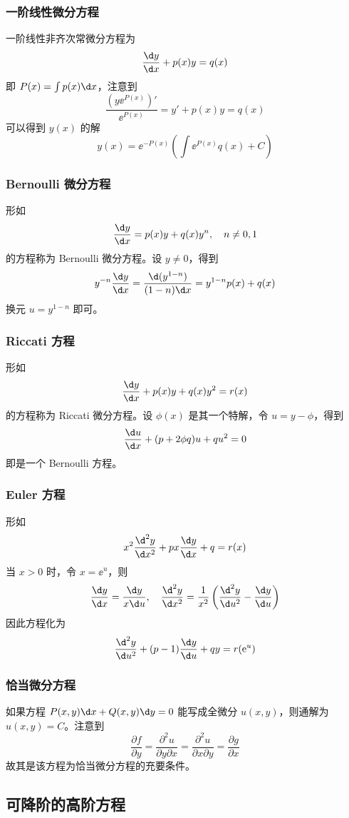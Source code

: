 \subsubsection*{一阶线性微分方程}

一阶线性非齐次常微分方程为
\[ \frac{\d y}{\d x} + p(x) y = q(x) \]
即 $P(x) = \int p(x) \d x$，注意到
\[ \frac{\left(y\ee^{P(x)}\right)'}{\ee^{P(x)}} =  y' + p(x) y = q(x) \]
可以得到 $y(x)$ 的解
\[ y(x) = \ee^{-P(x)} \left( \int \ee^{P(x)} q(x) + C \right)  \]

\subsubsection*{Bernoulli 微分方程} 形如
\[ \frac{\d y}{\d x} = p(x) y + q(x) y^n, \quad n \neq 0,1 \]
的方程称为 Bernoulli 微分方程。设 $y \neq 0$，得到
\[ y^{-n} \frac{\d y}{\d x} = \frac{\d (y^{1-n})}{(1-n)\d x} = y^{1-n}p(x) + q(x) \]
换元 $u = y^{1-n}$ 即可。

\subsubsection*{Riccati 方程}
形如
\[ \frac{\d y}{\d x} + p(x) y + q(x)y^2 = r(x) \]
的方程称为 Riccati 微分方程。设 $\phi(x)$ 是其一个特解，令 $u = y - \phi$，得到
\[ \frac{\d u}{\d x} + (p + 2 \phi q) u + q u^2 = 0 \]
即是一个 Bernoulli 方程。

\subsubsection*{Euler 方程}
形如
\[ x^2 \frac{\d^2 y}{\d x^2} + p x \frac{\d y}{\d x} + q = r(x) \]
当 $x > 0$ 时，令 $x = \ee^u$，则
\[ \frac{\d y}{\d x} = \frac{\d y}{x \d u}, \quad \frac{\d^2 y}{\d x^2} = \frac{1}{x^2} \left( \frac{\d^2 y}{\d u^2} - \frac{\d y}{\d u} \right) \]
因此方程化为
\[ \frac{\d^2 y}{\d u^2} + (p-1) \frac{\d y}{\d u} + qy = r(\ee^u) \]


\subsubsection*{恰当微分方程}

如果方程 $P(x, y) \d x + Q(x, y) \d y = 0$ 能写成全微分 $u(x, y)$，则通解为 $u(x, y) = C$。注意到
\[ \frac{\partial f}{\partial y} = \frac{\partial^2 u}{\partial y \partial x} = \frac{\partial^2 u}{\partial x \partial y} = \frac{\partial g}{\partial x} \]
故其是该方程为恰当微分方程的充要条件。

\subsection{可降阶的高阶方程}

